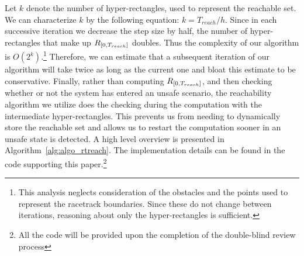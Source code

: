 \documentclass[manuscript,screen,review]{acmart}
\newcommand{\diego}[1]{\textcolor{purple}{\textbf{\underline{DM:}} #1}}
\begin{document}
Let $k$ denote the number of hyper-rectangles, used to represent the reachable set. We can characterize $k$ by the following equation: $k = T_{reach} / h$. Since in each successive iteration we decrease the step size by half, the number of hyper-rectangles that make up $\mathnormal{R}_{[0,T_{reach}]}$ doubles. Thus the complexity of our algorithm is $O(2^k)$.\footnote{This analysis neglects consideration of the obstacles and the points used to represent the racetrack boundaries. Since these do not change between iterations, reasoning about only the hyper-rectangles is sufficient.} Therefore, we can estimate that a subsequent iteration of our algorithm will take twice as long as the current one and bloat this estimate to be conservative. Finally, rather than computing $\mathnormal{R}_{[0,T_{reach}]}$, and then checking whether or not the system has entered an unsafe scenario, the reachability algorithm we utilize does the checking during the computation with the intermediate hyper-rectangles. This prevents us from needing to dynamically store the reachable set and allows us to restart the computation sooner in an unsafe state is detected. A high level overview is presented in Algorithm~\ref{alg:algo_rtreach}. The implementation details can be found in the code supporting this paper.\footnote{All the code will be provided upon the completion of the double-blind review process} %







\end{document}
